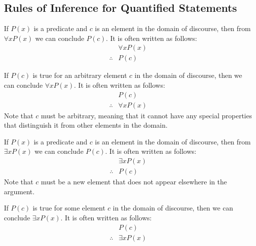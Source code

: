 \subsection{Rules of Inference for Quantified Statements}
\begin{definition}
    If $P(x)$ is a predicate and $c$ is an element in the domain of discourse, then from $\forall x P(x)$ we can conclude $P(c)$. It is often written as follows:
    \[
        \begin{array}{rl}
            & \forall x P(x) \\
            \hline
            \therefore & P(c)
        \end{array}
    \]
\end{definition}

\begin{definition}
    If $P(c)$ is true for an arbitrary element $c$ in the domain of discourse, then we can conclude $\forall x P(x)$. It is often written as follows:
    \[
        \begin{array}{rl}
            & P(c) \\
            \hline
            \therefore & \forall x P(x)
        \end{array}
    \]
    Note that $c$ must be arbitrary, meaning that it cannot have any special properties that distinguish it from other elements in the domain.
\end{definition}

\begin{definition}
    If $P(x)$ is a predicate and $c$ is an element in the domain of discourse, then from $\exists x P(x)$ we can conclude $P(c)$. It is often written as follows:
    \[
        \begin{array}{rl}
            & \exists x P(x) \\
            \hline
            \therefore & P(c)
        \end{array}
    \]
    Note that $c$ must be a new element that does not appear elsewhere in the argument.
\end{definition}

\begin{definition}
    If $P(c)$ is true for some element $c$ in the domain of discourse, then we can conclude $\exists x P(x)$. It is often written as follows:
    \[
        \begin{array}{rl}
            & P(c) \\
            \hline
            \therefore & \exists x P(x)
        \end{array}
    \]
\end{definition}

